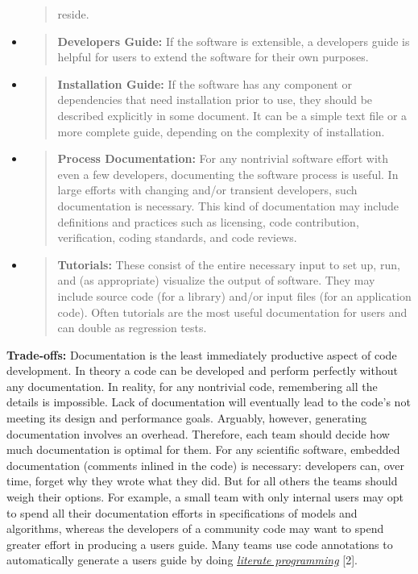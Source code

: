 \documentclass[]{article}
\begin{document}
\begin{itemize}
\begin{quote}
  reside.
  \end{quote}
\item
  \begin{quote}
  \textbf{Developers Guide:} If the software is extensible, a developers
  guide is helpful for users to extend the software for their own
  purposes.
  \end{quote}
\item
  \begin{quote}
  \textbf{Installation Guide:} If the software has any component or
  dependencies that need installation prior to use, they should be
  described explicitly in some document. It can be a simple text file or
  a more complete guide, depending on the complexity of installation.
  \end{quote}
\item
  \begin{quote}
  \textbf{Process Documentation:} For any nontrivial software effort
  with even a few developers, documenting the software process is
  useful. In large efforts with changing and/or transient developers,
  such documentation is necessary. This kind of documentation may
  include definitions and practices such as licensing, code
  contribution, verification, coding standards, and code reviews.
  \end{quote}
\item
  \begin{quote}
  \textbf{Tutorials:} These consist of the entire necessary input to set
  up, run, and (as appropriate) visualize the output of software. They
  may include source code (for a library) and/or input files (for an
  application code). Often tutorials are the most useful documentation
  for users and can double as regression tests.
  \end{quote}
\end{itemize}

\textbf{Trade-offs:} Documentation is the
least immediately productive aspect of code development. In theory a
code can be developed and perform perfectly without any documentation.
In reality, for any nontrivial code, remembering all the details is
impossible. Lack of documentation will eventually lead to the code's not
meeting its design and performance goals. Arguably, however, generating
documentation involves an overhead. Therefore, each team should decide
how much documentation is optimal for them. For any scientific software,
embedded documentation (comments inlined in the code) is necessary:
developers can, over time, forget why they wrote what they did. But for
all others the teams should weigh their options. For example, a small
team with only internal users may opt to spend all their documentation
efforts in specifications of models and algorithms, whereas the
developers of a community code may want to spend greater effort in
producing a users guide. Many teams use code annotations to
automatically generate a users guide by doing
\href{http://www-cs-faculty.stanford.edu/~uno/lp.html}{\emph{literate
programming}} {[}2{]}.
\end{document}

